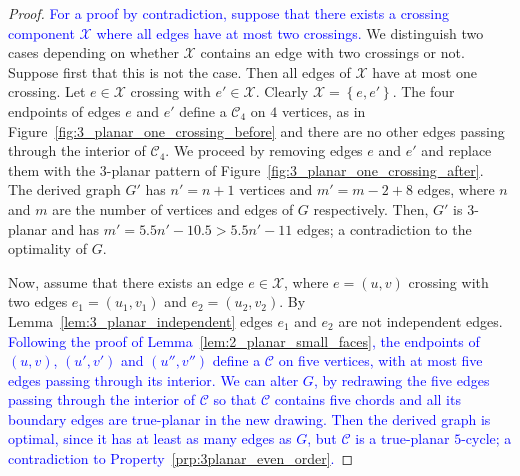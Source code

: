 \begin{proof}
\textcolor{blue}{For a proof by contradiction, suppose that there exists a crossing component $\mathcal{X}$ where all edges have at most two crossings.}
We distinguish two cases depending on whether $\mathcal{X}$ contains an edge with two crossings or not. Suppose first that this is not the case. Then all edges of $\mathcal{X}$ have at most one crossing. Let $e\in \mathcal{X}$ crossing with $e'\in \mathcal{X}$. Clearly $\mathcal{X}=\left\{e,e'\right\}$. The four endpoints of edges $e$ and $e'$ define a \pp $\mathcal{C}_4$ on $4$ vertices, as in Figure~\ref{fig:3_planar_one_crossing_before} and there are no other edges passing through the interior of $\mathcal{C}_4$. We proceed by removing edges $e$ and $e'$ and replace them with the $3$-planar pattern of Figure~\ref{fig:3_planar_one_crossing_after}. The derived graph $G'$ has $n'=n+1$ vertices and $m'=m-2+8$ edges, where $n$ and $m$ are the number of vertices and edges of $G$ respectively. Then, $G'$ is $3$-planar and has $m'=5.5n'-10.5>5.5n'-11$ edges; a contradiction to the optimality of $G$.

Now, assume that there exists an edge $e\in \mathcal{X}$, where $e=(u,v)$ crossing with two edges $e_1=(u_1,v_1)$ and $e_2=(u_2,v_2)$. By Lemma~\ref{lem:3_planar_independent} edges $e_1$ and $e_2$ are not independent edges. \textcolor{blue}{Following the proof of Lemma~\ref{lem:2_planar_small_faces}, the endpoints of $(u,v)$, $(u',v')$ and $(u'',v'')$ define a \pp $\mathcal{C}$ on five vertices, with at most five edges passing through its interior. We can alter $G$, by redrawing the five edges passing through the interior of $\mathcal{C}$ so that $\mathcal{C}$ contains five chords and all its boundary edges are true-planar in the new drawing. Then the derived graph is optimal, since it has at least as many edges as $G$, but $\mathcal{C}$ is a true-planar $5$-cycle; a contradiction to Property~\ref{prp:3planar_even_order}.}


\end{proof}

